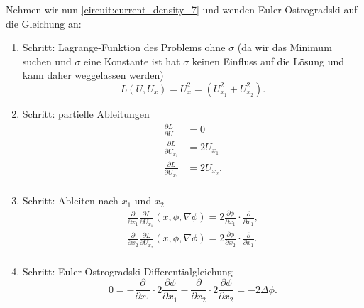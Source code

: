 Nehmen wir nun \eqref{circuit:current_density_7} und wenden Euler-Ostrogradski auf die Gleichung an:
\begin{enumerate}
	\item Schritt: Lagrange-Funktion des Problems ohne $\sigma$ (da wir das Minimum suchen und $\sigma$ eine Konstante ist hat $\sigma$ keinen Einfluss auf die Lösung und kann daher weggelassen werden)
	\begin{equation}
		L(U, U_x)= U_x^2 = (U_{x_1}^2+U_{x_2}^2).
	\end{equation}
	\item Schritt: partielle Ableitungen
	\begin{equation}
		\begin{aligned}
			\frac{\partial L}{\partial U}&=0\\
			\frac{\partial L}{\partial U_{x_1}}&=2U_{x_1}\\
			\frac{\partial L}{\partial U_{x_2}}&=2U_{x_2}.\\
		\end{aligned}
	\end{equation}
	\item Schritt: Ableiten nach $x_1$ und $x_2$
	\begin{equation}
		\begin{aligned}
			\frac{\partial}{\partial x_1}\frac{\partial L}{\partial U_{x_1}}(x,\phi,\nabla \phi)=2\frac{\partial \phi}{\partial {x_1}}\cdot \frac{\partial}{\partial x_1},\\
			\frac{\partial}{\partial x_2}\frac{\partial L}{\partial U_{x_2}}(x,\phi,\nabla \phi)=2\frac{\partial \phi}{\partial {x_2}} \cdot \frac{\partial}{\partial x_1}.\\
		\end{aligned}
	\end{equation}
	\item Schritt: Euler-Ostrogradski Differentialgleichung
	\begin{equation}
		0=-\frac{\partial}{\partial x_1}\cdot 2\frac{\partial \phi}{\partial {x_1}}-\frac{\partial}{\partial x_2}\cdot 2\frac{\partial \phi}{\partial {x_2}}=-2\Delta\phi.
	\end{equation}
\end{enumerate}

